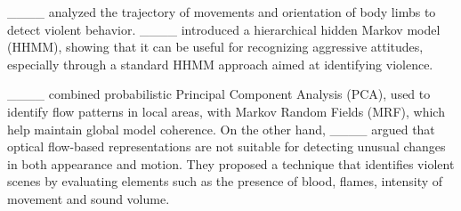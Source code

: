 ____ analyzed the trajectory of movements and orientation of body limbs to detect violent behavior. ____ introduced a hierarchical hidden Markov model (HHMM), showing that it can be useful for recognizing aggressive attitudes, especially through a standard HHMM approach aimed at identifying violence.

____ combined probabilistic Principal Component Analysis (PCA), used to identify flow patterns in local areas, with Markov Random Fields (MRF), which help maintain global model coherence. On the other hand, ____ argued that optical flow-based representations are not suitable for detecting unusual changes in both appearance and motion. They proposed a technique that identifies violent scenes by evaluating elements such as the presence of blood, flames, intensity of movement and sound volume.

